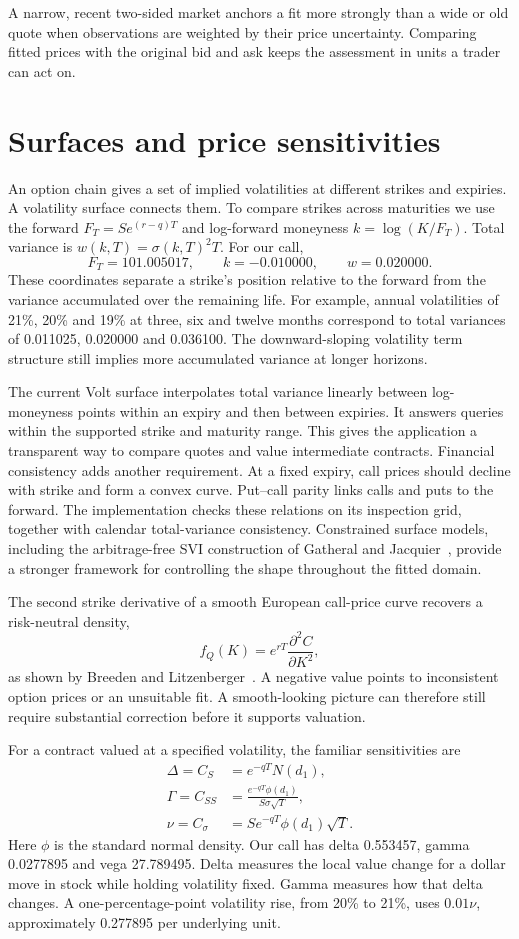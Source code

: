 \documentclass[8pt]{strategynet-journal}
\begin{document}
\begin{SNcolumns}
A narrow, recent two-sided market anchors a fit more strongly than a wide
or old quote when observations are weighted by their price uncertainty. Comparing fitted prices with the
original bid and ask keeps the assessment in units a trader can act on.

\section{Surfaces and price sensitivities}
An option chain gives a set of implied volatilities at different strikes and
expiries. A volatility surface connects them. To compare strikes across
maturities we use the forward $F_T=S e^{(r-q)T}$ and log-forward moneyness
$k=\log(K/F_T)$. Total variance is $w(k,T)=\sigma(k,T)^2T$. For our call,
\[
 F_T=101.005017,\qquad k=-0.010000,\qquad w=0.020000.
\]
These coordinates separate a strike's position relative to the forward from
the variance accumulated over the remaining life. For example, annual
volatilities of 21\%, 20\% and 19\% at three, six and twelve months correspond
to total variances of 0.011025, 0.020000 and 0.036100. The downward-sloping
volatility term structure still implies more accumulated variance at longer
horizons.

The current Volt surface interpolates total variance linearly between
log-moneyness points within an expiry and then between expiries. It answers
queries within the supported strike and maturity range. This gives the
application a transparent way to compare quotes and value intermediate
contracts. Financial consistency adds another requirement. At a fixed expiry,
call prices should decline with strike and form a convex curve. Put--call
parity links calls and puts to the forward. The implementation checks these
relations on its inspection grid, together with calendar total-variance
consistency. Constrained surface models, including the arbitrage-free SVI
construction of Gatheral and Jacquier~\cite{svi}, provide a stronger framework
for controlling the shape throughout the fitted domain.

The second strike derivative of a smooth European call-price curve recovers
a risk-neutral density,
\[
 f_Q(K)=e^{rT}\frac{\partial^2 C}{\partial K^2},
\]
as shown by Breeden and Litzenberger~\cite{bl}. A negative value points to
inconsistent option prices or an unsuitable fit. A smooth-looking picture can
therefore still require substantial correction before it supports valuation.

For a contract valued at a specified volatility, the familiar sensitivities are
\begin{align*}
 \Delta=C_S&=e^{-qT}N(d_1),\\
 \Gamma=C_{SS}&=\frac{e^{-qT}\phi(d_1)}{S\sigma\sqrt T},\\
 \nu=C_\sigma&=Se^{-qT}\phi(d_1)\sqrt T.
\end{align*}
Here $\phi$ is the standard normal density. Our call has delta 0.553457, gamma 0.0277895 and vega 27.789495. Delta measures
the local value change for a dollar move in stock while holding volatility
fixed. Gamma measures how that delta changes. A one-percentage-point volatility
rise, from 20\% to 21\%, uses $0.01\nu$, approximately 0.277895 per underlying
unit.


\end{SNcolumns}
\end{document}
